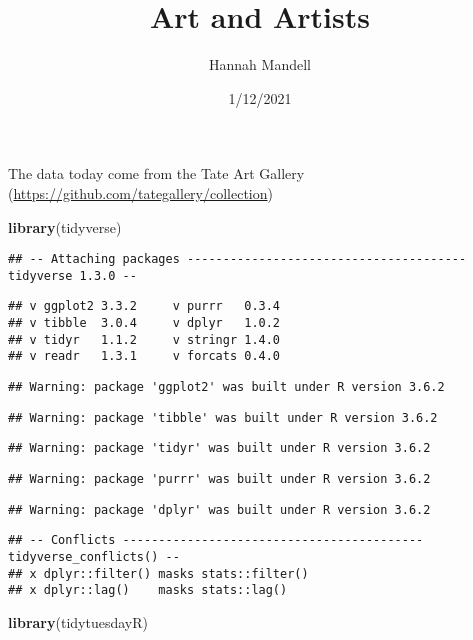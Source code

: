 \documentclass[]{article}
\title{Art and Artists}
\author{Hannah Mandell}
\date{1/12/2021}
\newenvironment{Shaded}{\begin{snugshade}}{\end{snugshade}}
\newcommand{\KeywordTok}[1]{\textcolor[rgb]{0.13,0.29,0.53}{\textbf{#1}}}
\newcommand{\NormalTok}[1]{#1}
\begin{document}
\maketitle

The data today come from the Tate Art Gallery
(\url{https://github.com/tategallery/collection})

\begin{Shaded}
\begin{Highlighting}[]
\KeywordTok{library}\NormalTok{(tidyverse)}
\end{Highlighting}
\end{Shaded}

\begin{verbatim}
## -- Attaching packages --------------------------------------- tidyverse 1.3.0 --
\end{verbatim}

\begin{verbatim}
## v ggplot2 3.3.2     v purrr   0.3.4
## v tibble  3.0.4     v dplyr   1.0.2
## v tidyr   1.1.2     v stringr 1.4.0
## v readr   1.3.1     v forcats 0.4.0
\end{verbatim}

\begin{verbatim}
## Warning: package 'ggplot2' was built under R version 3.6.2
\end{verbatim}

\begin{verbatim}
## Warning: package 'tibble' was built under R version 3.6.2
\end{verbatim}

\begin{verbatim}
## Warning: package 'tidyr' was built under R version 3.6.2
\end{verbatim}

\begin{verbatim}
## Warning: package 'purrr' was built under R version 3.6.2
\end{verbatim}

\begin{verbatim}
## Warning: package 'dplyr' was built under R version 3.6.2
\end{verbatim}

\begin{verbatim}
## -- Conflicts ------------------------------------------ tidyverse_conflicts() --
## x dplyr::filter() masks stats::filter()
## x dplyr::lag()    masks stats::lag()
\end{verbatim}

\begin{Shaded}
\begin{Highlighting}[]
\KeywordTok{library}\NormalTok{(tidytuesdayR)}
\end{Highlighting}
\end{Shaded}
\end{document}
